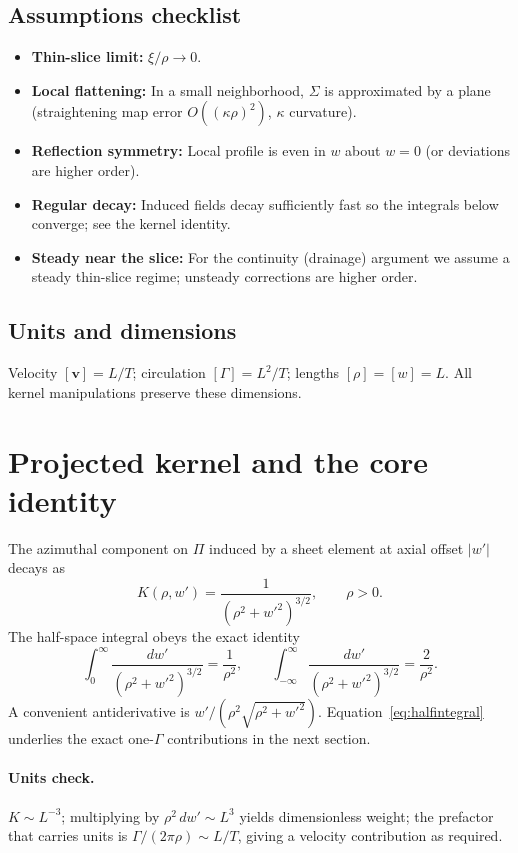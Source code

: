 \documentclass[11pt]{article}
\begin{document}
\subsection{Assumptions checklist}
\begin{itemize}
  \item \textbf{Thin-slice limit:} $\xi/\rho\to0$.
  \item \textbf{Local flattening:} In a small neighborhood, $\Sigma$ is approximated by a plane (straightening map error $O((\kappa\rho)^2)$, $\kappa$ curvature).
  \item \textbf{Reflection symmetry:} Local profile is even in $w$ about $w=0$ (or deviations are higher order).
  \item \textbf{Regular decay:} Induced fields decay sufficiently fast so the integrals below converge; see the kernel identity.
  \item \textbf{Steady near the slice:} For the continuity (drainage) argument we assume a steady thin-slice regime; unsteady corrections are higher order.
\end{itemize}

\subsection{Units and dimensions}
Velocity $[\bm v]=L/T$; circulation $[\Gamma]=L^2/T$; lengths $[\rho]=[w]=L$. All kernel manipulations preserve these dimensions.

\section{Projected kernel and the core identity}
The azimuthal component on $\Pi$ induced by a sheet element at axial offset $|w'|$ decays as
\begin{equation}
\label{eq:kernel}
K(\rho,w')=\frac{1}{(\rho^2+w'^2)^{3/2}},\qquad \rho>0.
\end{equation}
The half-space integral obeys the exact identity
\begin{equation}
\label{eq:halfintegral}
\int_0^{\infty}\!\frac{dw'}{(\rho^2+w'^2)^{3/2}}=\frac{1}{\rho^2},\qquad \int_{-\infty}^{\infty}\!\frac{dw'}{(\rho^2+w'^2)^{3/2}}=\frac{2}{\rho^2}.
\end{equation}
A convenient antiderivative is $w'/(\rho^2\sqrt{\rho^2+w'^2})$. Equation~\eqref{eq:halfintegral} underlies the exact one-$\Gamma$ contributions in the next section.

\paragraph{Units check.} $K\sim L^{-3}$; multiplying by $\rho^2\,dw'\sim L^3$ yields dimensionless weight; the prefactor that carries units is $\Gamma/(2\pi\rho)\sim L/T$, giving a velocity contribution as required.
\end{document}
